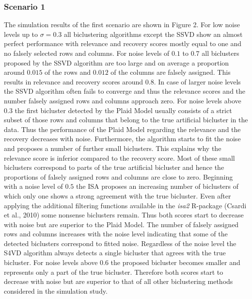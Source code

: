 \documentclass{bioinfo}
\begin{document}
\subsubsection{Scenario 1}
The simulation results of the first scenario are shown in Figure 2. For low noise levels up to $\sigma=0.3$ all biclustering algorithms except the SSVD show an almost perfect performance with relevance and recovery scores mostly equal to one and no falsely selected rows and columns. 
For noise levels of $0.1$ to $0.7$ all biclusters proposed by the SSVD algorithm are too large and on average a proportion around $0.015$ of the rows and $0.012$ of the columns are falsely assigned. This results in relevance and recovery scores around $0.8$. In case of larger noise levels the SSVD algorithm often fails to converge and thus the relevance scores and the number falsely assigned rows and columns approach zero. 
For noise levels above $0.3$ the first bicluster detected by the Plaid Model usually consists of a strict subset of those rows and columns that belong to the true artificial bicluster in the data. Thus the performance of the Plaid Model regarding the relevance and the recovery decreases with noise. 
Furthermore, the algorithm starts to fit the noise and proposes a number of further small biclusters. This explains why the relevance score is inferior compared to the recovery score. Most of these small biclusters correspond to parts of the true artificial bicluster and hence the proportions of falsely assigned rows and columns are close to zero. Beginning with a noise level of $0.5$ the ISA proposes an increasing number of biclusters of which only one shows a strong agreement with the true bicluster. Even after applying the additional filtering functions available in the \textit{isa2} R-package (Csardi et al., 2010) some nonsense biclusters remain. Thus both scores start to decrease with noise but are superior to the Plaid Model. The number of falsely assigned rows and columns increases with the noise level indicating that some of the detected biclusters correspond to fitted noise. Regardless of the noise level the S4VD algorithm always detects a single bicluster that agrees with the true bicluster. For noise levels above $0.6$ the proposed bicluster becomes smaller and represents only a part of the true bicluster. Therefore both scores start to decrease with noise but are superior to that of all other biclustering methods considered in the simulation study. %
\end{document}

